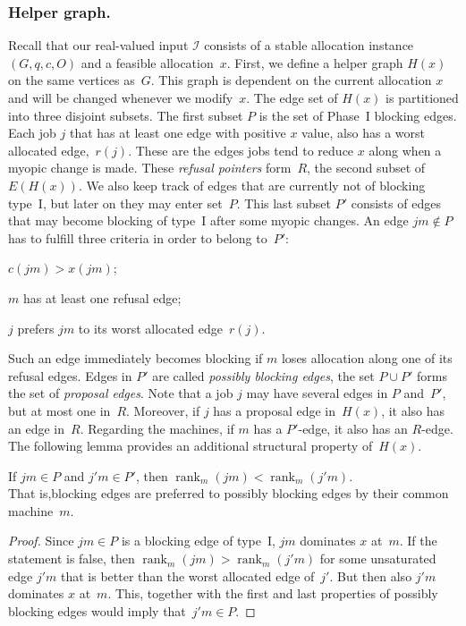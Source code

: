 \documentclass{llncs}
\DeclareMathOperator{\rank}{rank}
\begin{document}
\subsubsection*{Helper graph.}
Recall that our real-valued input $\mathcal{I}$ consists of a stable allocation instance $(G, q, c,O)$ and a feasible allocation~$x$. First, we define a helper graph $H(x)$ on the same vertices as~$G$. This graph is dependent on the current allocation $x$ and will be changed whenever we modify~$x$. The edge set of $H(x)$ is partitioned into three disjoint subsets. The first subset $P$ is the set of Phase~I blocking edges. Each job $j$ that has at least one edge with positive $x$ value, also has a worst allocated edge,~$r(j)$. These are the edges jobs tend to reduce $x$ along when a myopic change is made. These \emph{refusal pointers} form~$R$, the second subset of~$E(H(x))$. We also keep track of edges that are currently not of blocking type~I, but later on they may enter set~$P$. This last subset $P'$ consists of edges that may become blocking of type~I after some myopic changes. An edge $jm \notin P$ has to fulfill three criteria in order to belong to~$P'$: \begin{inparaenum}[1)]
    \item $c(jm) > x(jm)$;
    \item $m$ has at least one refusal edge;
    \item $j$ prefers $jm$ to its worst allocated edge~$r(j)$.
  \end{inparaenum}
Such an edge immediately becomes blocking if $m$ loses allocation along one of its refusal edges. Edges in $P'$ are called \emph{possibly blocking edges}, the set $P \cup P'$ forms the set of \emph{proposal edges}. Note that a job $j$ may have several edges in $P$ and~$P'$, but at most one in~$R$. Moreover, if $j$ has a proposal edge in~$H(x)$, it also has an edge in~$R$. Regarding the machines, if $m$ has a $P'$-edge, it also has an $R$-edge. The following lemma provides an additional structural property of~$H(x)$.

\begin{lemma}
\label{p_good}
	If $jm \in P$ and $j'm \in P'$, then $\rank_m(jm) < \rank_m(j'm)$. \\That is,blocking edges are preferred to possibly blocking edges by their common machine~$m$.
\end{lemma}

\begin{proof}
	Since $jm \in P$ is a blocking edge of type~I, $jm$ dominates $x$ at~$m$. If the statement is false, then $\rank_m(jm) > \rank_m(j'm)$ for some unsaturated edge $j'm$ that is better than the worst allocated edge of~$j'$. But then also $j'm$ dominates $x$ at~$m$. This, together with the first and last properties of possibly blocking edges would imply that~$j'm \in P$.
\end{proof}
\end{document}
